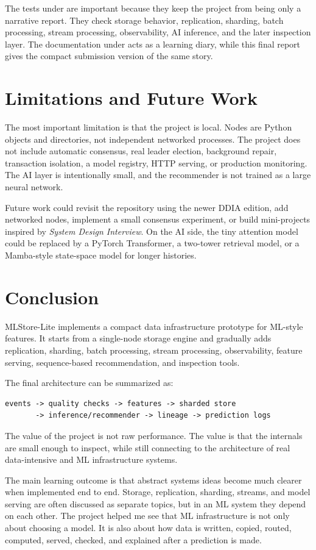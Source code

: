 The tests under  are important because they keep the project from
being only a narrative report. They check storage behavior, replication,
sharding, batch processing, stream processing, observability, AI inference, and
the later inspection layer. The documentation under 
acts as a learning diary, while this final report gives the compact submission
version of the same story.

\section{Limitations and Future Work}\label{sec:limitations}

The most important limitation is that the project is local. Nodes are Python
objects and directories, not independent networked processes. The project does
not include automatic consensus, real leader election, background repair,
transaction isolation, a model registry, HTTP serving, or production monitoring.
The AI layer is intentionally small, and the recommender is not trained as a
large neural network.

Future work could revisit the repository using the newer DDIA edition, add
networked nodes, implement a small consensus experiment, or build mini-projects
inspired by \textit{System Design Interview}. On the AI side, the tiny attention
model could be replaced by a PyTorch Transformer, a two-tower retrieval model,
or a Mamba-style state-space model for longer histories.

\section{Conclusion}\label{sec:conclusion}

MLStore-Lite implements a compact data infrastructure prototype for ML-style
features. It starts from a single-node storage engine and gradually adds
replication, sharding, batch processing, stream processing, observability,
feature serving, sequence-based recommendation, and inspection tools.

The final architecture can be summarized as:

\begin{lstlisting}
events -> quality checks -> features -> sharded store
       -> inference/recommender -> lineage -> prediction logs
\end{lstlisting}

The value of the project is not raw performance. The value is that the internals
are small enough to inspect, while still connecting to the architecture of real
data-intensive and ML infrastructure systems.

The main learning outcome is that abstract systems ideas become much clearer
when implemented end to end. Storage, replication, sharding, streams, and model
serving are often discussed as separate topics, but in an ML system they depend
on each other. The project helped me see that ML infrastructure is not only
about choosing a model. It is also about how data is written, copied, routed,
computed, served, checked, and explained after a prediction is made.

